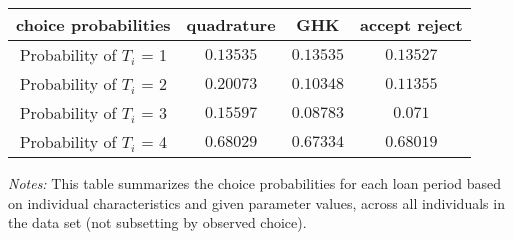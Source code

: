 \begin{tabular}{cccc}
\toprule
choice probabilities & quadrature & GHK & accept reject\\
\toprule
Probability of $T_i$ = 1 & $0.13535$ & $0.13535$ & $0.13527$\\
Probability of $T_i$ = 2 & $0.20073$ & $0.10348$ & $0.11355$\\
Probability of $T_i$ = 3 & $0.15597$ & $0.08783$ & $0.071$\\
Probability of $T_i$ = 4 & $0.68029$ & $0.67334$ & $0.68019$\\
\toprule
\end{tabular} 
\par \medskip 
\begin{minipage}[!htbp]{0.8 \textwidth}
	{\small \textit{Notes:} This table summarizes the choice probabilities for each loan period based on individual characteristics and given parameter values, across all individuals in the data set (not subsetting by observed choice).}
\end{minipage}